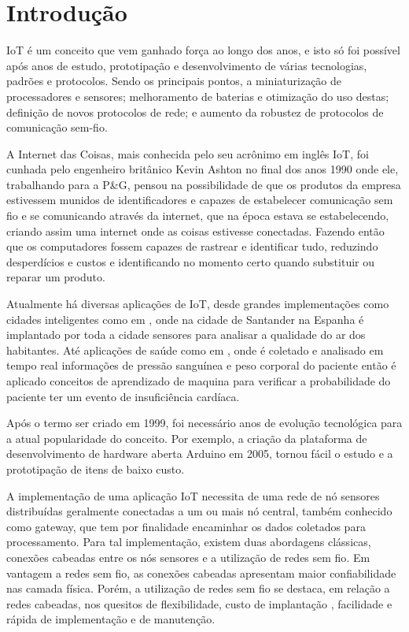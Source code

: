 \chapter*[Introdução]{Introdução}

IoT é um conceito que vem ganhado força ao longo dos anos, e isto só foi possível após anos de estudo, prototipação e desenvolvimento de várias tecnologias, padrões e protocolos. Sendo os principais pontos, a miniaturização de processadores e sensores; melhoramento de baterias e otimização do uso destas; definição de novos protocolos de rede; e aumento da robustez de protocolos de comunicação sem-fio.

A Internet das Coisas, mais conhecida pelo seu acrônimo em inglês IoT, foi cunhada pelo engenheiro britânico Kevin Ashton no final dos anos 1990 onde ele, trabalhando para a P\&G, pensou na possibilidade de que os produtos da empresa estivessem munidos de identificadores e capazes de estabelecer comunicação sem fio e se comunicando através da internet, que na época estava se estabelecendo, criando assim uma internet onde as coisas estivesse conectadas\cite{KA_IOT}. Fazendo então que os computadores fossem capazes de rastrear e identificar tudo, reduzindo desperdícios e custos e identificando no momento certo quando substituir ou reparar um produto\cite{lopezIOT}.

Atualmente há diversas aplicações de IoT, desde grandes implementações como cidades inteligentes como em \cite{sotres2017practical}, onde na cidade de Santander na Espanha é implantado por toda a cidade sensores para analisar a qualidade do ar dos habitantes. Até aplicações de saúde como em \cite{zhang2015remote}, onde é coletado e analisado em tempo real informações de pressão sanguínea e peso corporal do paciente então é aplicado conceitos de aprendizado de maquina para verificar a probabilidade do paciente ter um evento de insuficiência cardíaca.

Após o termo ser criado em 1999, foi necessário anos de evolução tecnológica para a atual popularidade do conceito. Por exemplo, a criação da plataforma de desenvolvimento de hardware aberta Arduino em 2005\cite{OC_ARDUINO}, tornou fácil o estudo e a prototipação de itens de baixo custo. 

A implementação de uma aplicação IoT necessita de uma rede de nó sensores distribuídas geralmente conectadas a um ou mais nó central, também conhecido como gateway, que tem por finalidade encaminhar os dados coletados para processamento. Para tal implementação, existem duas abordagens clássicas, conexões cabeadas entre os nós sensores e a utilização de redes sem fio\cite{gomes2017estimaccao}. Em vantagem a redes sem fio, as conexões cabeadas apresentam maior confiabilidade nas camada física. Porém, a utilização de redes sem fio se destaca, em relação a redes cabeadas, nos quesitos de flexibilidade, custo de implantação , facilidade e rápida de implementação e de manutenção\cite{gungor2009industrial}.

